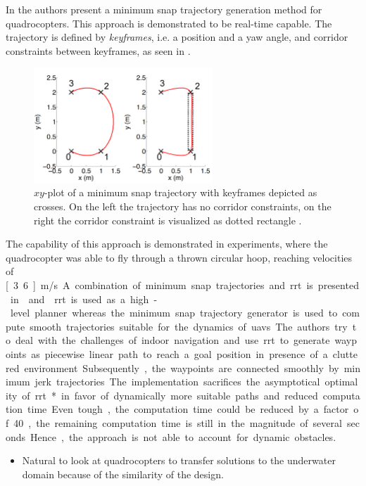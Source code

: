 In \cite{MellingerKumar11} the authors present a minimum snap trajectory generation method for quadrocopters. This approach is demonstrated to be real-time capable. The trajectory is defined by \emph{keyframes}, i.e. a position and a yaw angle, and corridor constraints between keyframes, as seen in .
\begin{figure}
    \centering
    \includegraphics[width=0.6\textwidth]{images/02/mellinger.png}
    \caption{$xy$-plot of a minimum snap trajectory with keyframes depicted as crosses. On the left the trajectory has no corridor constraints, on the right the corridor constraint is visualized as dotted rectangle \cite{MellingerKumar11}.}
    \label{fig:mellinger}
\end{figure}
The capability of this approach is demonstrated in experiments, where the quadrocopter was able to fly through a thrown circular hoop, reaching velocities of \unit[3.6]{m/s}.

A combination of minimum snap trajectories and \ac{rrt} is presented in \cite{Richter16} and \cite{Shi20}.
\ac{rrt} is used as a high-level planner whereas the minimum snap trajectory generator is used to compute smooth trajectories suitable for the dynamics of \acp{uav}. 
The authors try to deal with the challenges of indoor navigation and use \ac{rrt} to generate waypoints as piecewise linear path to reach a goal position in presence of a cluttered environment. Subsequently, the waypoints are connected smoothly by minimum jerk trajectories.
The implementation sacrifices the asymptotical optimality of \ac{rrt}* in favor of dynamically more suitable paths and reduced computation time. Even tough, the computation time could be reduced by a factor of 40, the remaining computation time is still in the magnitude of several seconds. Hence, the approach is not able to account for dynamic obstacles.


\begin{itemize}
    \color{red}
    \item Natural to look at quadrocopters to transfer solutions to the underwater domain because of the similarity of the design.
\end{itemize}
